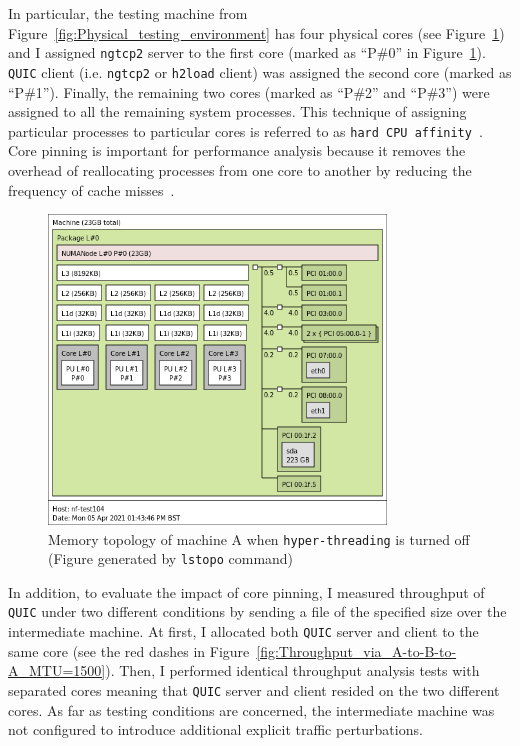 \documentclass[12pt,a4paper]{report}
\begin{document}
In particular, the testing machine from Figure~\ref{fig:Physical_testing_environment} has four physical cores (see Figure~\ref{fig:memory_topology}) and I assigned \texttt{ngtcp2} server to the first core (marked as \enquote{P\#0} in Figure~\ref{fig:memory_topology}).
\texttt{QUIC} client (i.e. \texttt{ngtcp2} or \texttt{h2load} client) was assigned the second core (marked as \enquote{P\#1}).
Finally, the remaining two cores (marked as \enquote{P\#2} and \enquote{P\#3}) were assigned to all the remaining system processes.
This technique of assigning particular processes to particular cores is referred to as \texttt{hard CPU affinity}~\cite{CPU_Affinity}.
Core pinning is important for performance analysis because it removes the overhead of reallocating processes from one core to another by reducing the frequency of cache misses~\cite{Tuning_10Gb_network_cards_on_Linux}.

    \begin{figure}[H]
    \centering
    \includegraphics[width=0.8\textwidth]{figs/memory_topology.png}
    \caption[Memory topology of machine A  when \texttt{hyper-threading} is turned off]{Memory topology of machine A  when \texttt{hyper-threading} is turned off (Figure generated by \texttt{lstopo} command)}
    \label{fig:memory_topology}
    \end{figure}

In addition, to evaluate the impact of core pinning, I measured throughput of \texttt{QUIC} under two different conditions by sending a file of the specified size over the intermediate machine.
At first, I allocated both \texttt{QUIC} server and client to the same core (see the red dashes in Figure~\ref{fig:Throughput_via_A-to-B-to-A_MTU=1500}).
Then, I performed identical throughput analysis tests with separated cores meaning that \texttt{QUIC} server and client resided on the two different cores.
As far as testing conditions are concerned, the intermediate machine was not configured to introduce additional explicit traffic perturbations.
\end{document}
